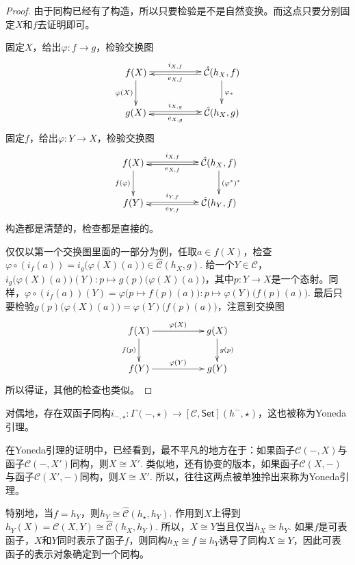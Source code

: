 \begin{proof}
	由于同构已经有了构造，所以只要检验是不是自然变换。而这点只要分别固定$X$和$f$去证明即可。

	固定$X$，给出$\varphi:f\to g$，检验交换图
	\[
	\begin{xy}
		\xymatrix{
			f(X)\ar@<0.3ex>[rr]^-{i_{X,f}} \ar[d]_{\varphi(X)}&&{\hat{\mathcal{C}}}(h_X,f) \ar[d]^{\varphi_*}\ar@<0.3ex>[ll]^-{e_{X,f}}\\
			g(X)\ar@<0.3ex>[rr]^-{i_{X,g}}&&{\hat{\mathcal{C}}}(h_X,g)\ar@<0.3ex>[ll]^-{e_{X,g}}
		}
	\end{xy}
	\]
	固定$f$，给出$\varphi:Y\to X$，检验交换图
	\[
	\begin{xy}
		\xymatrix{
			f(X)\ar@<0.3ex>[rr]^-{i_{X,f}} \ar[d]_{f(\varphi)}&&{\hat{\mathcal{C}}}(h_X,f) \ar[d]^{(\varphi^*)^*}\ar@<0.3ex>[ll]^-{e_{X,f}}\\
			f(Y)\ar@<0.3ex>[rr]^-{i_{Y,f}}&&{\hat{\mathcal{C}}}(h_Y,f)\ar@<0.3ex>[ll]^-{e_{Y,f}}
		}
	\end{xy}
	\]
	构造都是清楚的，检查都是直接的。
	
	仅仅以第一个交换图里面的一部分为例，任取$a\in f(X)$，检查$\varphi\circ (i_f(a))=i_g\bigl(\varphi(X)(a)\bigr)\in {\hat{\mathcal{C}}}(h_X,g)$. 给一个$Y\in \mathcal{C}$，$i_g\bigl(\varphi(X)(a)\bigr)(Y):p\mapsto g(p)\bigl (\varphi(X)(a)\bigr)$，其中$p:Y\to X$是一个态射。同样，$\varphi\circ (i_f(a))(Y)=\varphi\bigl(p\mapsto f(p)(a)\bigr):p\mapsto \varphi(Y)\bigl(f(p)(a)\bigr)$. 最后只要检验$g(p)\bigl (\varphi(X)(a)\bigr)=\varphi(Y)\bigl(f(p)(a)\bigr)$，注意到交换图
	\[
	\begin{xy}
		\xymatrix{
			f(X)\ar[rr]^{\varphi(X)} \ar[d]_{f(p)}&&g(X) \ar[d]^{g(p)}\\
			f(Y)\ar[rr]^{\varphi(Y)}&&g(Y)
		}
	\end{xy}
	\]
	所以得证，其他的检查也类似。
\end{proof}

\begin{pro}
对偶地，存在双函子同构$i_{-,\star}:\Gamma(-,\star)\to [\mathcal{C},\mathsf{Set}](h^-,\star)$，这也被称为Yoneda引理。
\end{pro}

在Yoneda引理的证明中，已经看到，最不平凡的地方在于：如果函子$\mathcal{C}(-,X)$与函子$\mathcal{C}(-,X')$同构，则$X\cong X'$. 类似地，还有协变的版本，如果函子$\mathcal{C}(X,-)$与函子$\mathcal{C}(X',-)$同构，则$X\cong X'$. 所以，往往这两点被单独拎出来称为Yoneda引理。

\para 特别地，当$f=h_Y$，则$h_Y\cong {\hat{\mathcal{C}}}(h_\star,h_Y)$. 作用到$X$上得到$h_Y(X)={\mathcal{C}}(X,Y)\cong {\hat{\mathcal{C}}}(h_X,h_Y)$. 所以，$X\cong Y$当且仅当$h_X\cong h_Y$. 如果$f$是可表函子，$X$和$Y$同时表示了函子$f$，则同构$h_X\cong f \cong h_Y$诱导了同构$X\cong Y$，因此可表函子的表示对象确定到一个同构。 

